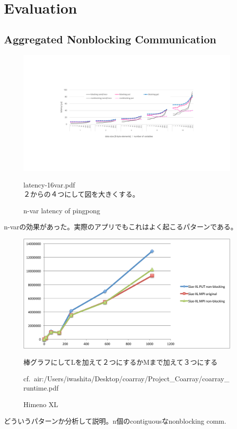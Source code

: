 \section{Evaluation}\label{sec:eval}

\subsection{Aggregated Nonblocking Communication}


\begin{figure}[tbh]
  \begin{center}
  \includegraphics[scale=0.55,trim=6cm 0cm 4cm 6cm,clip]{figs/latency-16var.pdf}

  latency-16var.pdf\\
  ２からの４つにして図を大きくする。
  \caption{n-var latency of pingpong}\label{fig:nvar-pp}
  \end{center}
\end{figure}

n-varの効果があった。実際のアプリでもこれはよく起こるパターンである。


\begin{figure}[tbh]
  \begin{center}
  \includegraphics[scale=0.55]{figs/himeno.pdf}

  棒グラフにしてLを加えて２つにするかMまで加えて３つにする

  cf.\ air:/Users/iwashita/Desktop/coarray/Project\_Coarray/coarray\_runtime.pdf

  \caption{Himeno XL}\label{fig:himeno}
  \end{center}
\end{figure}


どういうパターンか分析して説明。n個のcontiguousなnonblocking comm.

